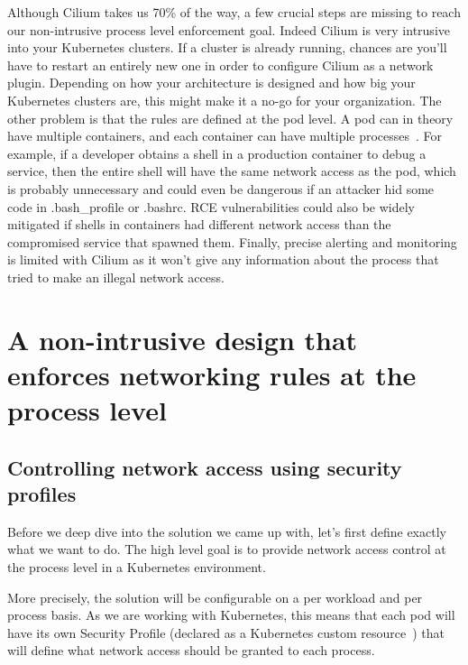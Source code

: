 Although Cilium takes us 70\% of the way, a few crucial steps are missing to reach our non-intrusive process level enforcement goal. Indeed Cilium is very intrusive into your Kubernetes clusters. If a cluster is already running, chances are you’ll have to restart an entirely new one in order to configure Cilium as a network plugin. Depending on how your architecture is designed and how big your Kubernetes clusters are, this might make it a no-go for your organization. The other problem is that the rules are defined at the pod level. A pod can in theory have multiple containers, and each container can have multiple processes~\cite{ProcessLevelNetworkSecurityMonitoring:StefanSchimanskiMichaelHausenblas}. For example, if a developer obtains a shell in a production container to debug a service, then the entire shell will have the same network access as the pod, which is probably unnecessary and could even be dangerous if an attacker hid some code in .bash\_profile or .bashrc. RCE vulnerabilities could also be widely mitigated if shells in containers had different network access than the compromised service that spawned them. Finally, precise alerting and monitoring is limited with Cilium as it won’t give any information about the process that tried to make an illegal network access.

\section{A non-intrusive design that enforces networking rules at the process level}

\subsection{Controlling network access using security profiles}

Before we deep dive into the solution we came up with, let’s first define exactly what we want to do. The high level goal is to provide network access control at the process level in a Kubernetes environment.

More precisely, the solution will be configurable on a per workload and per process basis. As we are working with Kubernetes, this means that each pod will have its own Security Profile (declared as a Kubernetes custom resource~\cite{ProcessLevelNetworkSecurityMonitoring:CustomResources}) that will define what network access should be granted to each process.



